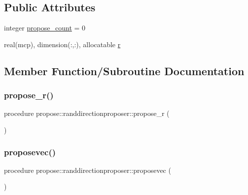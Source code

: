 \subsection*{Public Attributes}
\begin{DoxyCompactItemize}
\item 
integer \mbox{\hyperlink{structpropose_1_1randdirectionproposer_a9d4cd38e5a89ce4a7ebf006053e09c82}{propose\+\_\+count}} = 0
\item 
real(mcp), dimension(\+:,\+:), allocatable \mbox{\hyperlink{structpropose_1_1randdirectionproposer_a14eb3500d0941ef4dd938f149b404fe0}{r}}
\end{DoxyCompactItemize}


\subsection{Member Function/\+Subroutine Documentation}
\mbox{\label{structpropose_1_1randdirectionproposer_af2a22e23a2ac8d6b7d6cdc4bbbc8a1d3}} 
\subsubsection{\texorpdfstring{propose\+\_\+r()}{propose\_r()}}
{\footnotesize\ttfamily procedure propose\+::randdirectionproposer\+::propose\+\_\+r (\begin{DoxyParamCaption}{ }\end{DoxyParamCaption})}

\mbox{\label{structpropose_1_1randdirectionproposer_a1d9df745255cd310cd8c13533b35479f}} 
\subsubsection{\texorpdfstring{proposevec()}{proposevec()}}
{\footnotesize\ttfamily procedure propose\+::randdirectionproposer\+::proposevec (\begin{DoxyParamCaption}{ }\end{DoxyParamCaption})}



